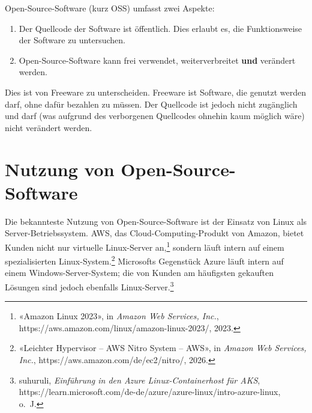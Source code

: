 \documentclass[
  nswissgerman,
  a4paper,
  DIV=11,
  numbers=noendperiod,
  ngerman]{scrreprt}
\providecommand{\tightlist}{%
  \setlength{\itemsep}{0pt}\setlength{\parskip}{0pt}}
\begin{document}
\begin{tcolorbox}[enhanced jigsaw, arc=.35mm, bottomrule=.15mm, bottomtitle=1mm, breakable, colback=white, colbacktitle=quarto-callout-note-color!10!white, colframe=quarto-callout-note-color-frame, coltitle=black, left=2mm, leftrule=.75mm, opacityback=0, opacitybacktitle=0.6, rightrule=.15mm, title=\textcolor{quarto-callout-note-color}{\faInfo}\hspace{0.5em}{Was ist Open-Source-Software}, titlerule=0mm, toprule=.15mm, toptitle=1mm]

Open-Source-Software (kurz OSS) umfasst zwei Aspekte:

\begin{enumerate}
\def\labelenumi{\arabic{enumi}.}
\tightlist
\item
  Der Quellcode der Software ist öffentlich. Dies erlaubt es, die
  Funktionsweise der Software zu untersuchen.
\item
  Open-Source-Software kann frei verwendet, weiterverbreitet
  \textbf{und} verändert werden.
\end{enumerate}

Dies ist von Freeware zu unterscheiden. Freeware ist Software, die
genutzt werden darf, ohne dafür bezahlen zu müssen. Der Quellcode ist
jedoch nicht zugänglich und darf (was aufgrund des verborgenen
Quellcodes ohnehin kaum möglich wäre) nicht verändert werden.

\end{tcolorbox}

\section{Nutzung von
Open-Source-Software}\label{nutzung-von-open-source-software}

Die bekannteste Nutzung von Open-Source-Software ist der Einsatz von
Linux als Server-Betriebssystem. AWS, das Cloud-Computing-Produkt von
Amazon, bietet Kunden nicht nur virtuelle Linux-Server an,\footnote{{«Amazon
  {Linux} 2023»}, in \emph{Amazon Web Services, Inc.},
  https://aws.amazon.com/linux/amazon-linux-2023/, 2023.} sondern läuft
intern auf einem spezialisierten Linux-System.\footnote{{«{Leichter
  Hypervisor -- AWS Nitro System -- AWS}»}, in \emph{Amazon Web
  Services, Inc.}, https://aws.amazon.com/de/ec2/nitro/, 2026.}
Microsofts Gegenstück Azure läuft intern auf einem
Windows-Server-System; die von Kunden am häufigsten gekauften Lösungen
sind jedoch ebenfalls Linux-Server.\footnote{{suhuruli},
  \emph{{Einführung in den Azure Linux-Containerhost für AKS}},
  https://learn.microsoft.com/de-de/azure/azure-linux/intro-azure-linux,
  o.~J.}
\end{document}
